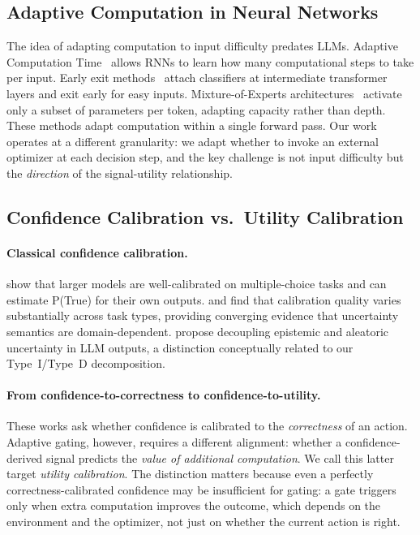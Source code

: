 \subsection{Adaptive Computation in Neural Networks}

The idea of adapting computation to input difficulty predates LLMs.
Adaptive Computation Time~\cite{graves2016act} allows RNNs to learn
how many computational steps to take per input. Early exit
methods~\cite{teerapittayanon2016branchynet, elhoushi2024layerskip}
attach classifiers at intermediate transformer layers and exit early
for easy inputs. Mixture-of-Experts
architectures~\cite{shazeer2017moe, raposo2024mixtureofdepths}
activate only a subset of parameters per token, adapting capacity
rather than depth. These methods adapt computation within a single
forward pass. Our work operates at a different granularity: we
adapt whether to invoke an external optimizer at each decision step,
and the key challenge is not input difficulty but the
\emph{direction} of the signal-utility relationship.

\subsection{Confidence Calibration vs.\ Utility Calibration}
\label{app:calibration}

\paragraph{Classical confidence calibration.}
\citet{kadavath2022knowwhat} show that larger models are
well-calibrated on multiple-choice tasks and can estimate P(True)
for their own outputs.
\citet{tao2025revisiting} and \citet{heo2025llmuncertainty} find
that calibration quality varies substantially across task types,
providing converging evidence that uncertainty semantics are
domain-dependent.
\citet{yadkori2024believe} propose decoupling epistemic and
aleatoric uncertainty in LLM outputs, a distinction conceptually
related to our Type~I/Type~D decomposition.

\paragraph{From confidence-to-correctness to confidence-to-utility.}
These works ask whether confidence is calibrated to the
\emph{correctness} of an action. Adaptive gating, however,
requires a different alignment: whether a confidence-derived
signal predicts the \emph{value of additional computation}. We
call this latter target \emph{utility calibration}. The
distinction matters because even a perfectly
correctness-calibrated confidence may be insufficient for
gating: a gate triggers only when extra computation improves
the outcome, which depends on the environment and the
optimizer, not just on whether the current action is right.

